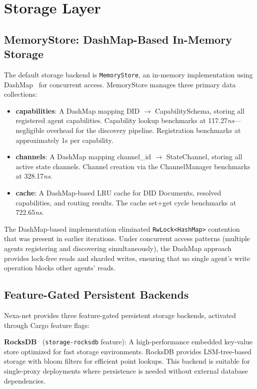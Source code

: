 \section{Storage Layer}

\subsection{MemoryStore: DashMap-Based In-Memory Storage}

The default storage backend is \texttt{MemoryStore}, an in-memory implementation using DashMap~\cite{dashmap2022} for concurrent access. MemoryStore manages three primary data collections:

\begin{itemize}
  \item \textbf{capabilities}: A DashMap mapping DID $\rightarrow$ CapabilitySchema, storing all registered agent capabilities. Capability lookup benchmarks at 117.27\textit{ns}---negligible overhead for the discovery pipeline. Registration benchmarks at approximately 1\textmu s per capability.
  \item \textbf{channels}: A DashMap mapping channel\_id $\rightarrow$ StateChannel, storing all active state channels. Channel creation via the ChannelManager benchmarks at 328.17\textit{ns}.
  \item \textbf{cache}: A DashMap-based LRU cache for DID Documents, resolved capabilities, and routing results. The cache set+get cycle benchmarks at 722.65\textit{ns}.
\end{itemize}

The DashMap-based implementation eliminated \texttt{RwLock<HashMap>} contention that was present in earlier iterations. Under concurrent access patterns (multiple agents registering and discovering simultaneously), the DashMap approach provides lock-free reads and sharded writes, ensuring that no single agent's write operation blocks other agents' reads.

\subsection{Feature-Gated Persistent Backends}

Nexa-net provides three feature-gated persistent storage backends, activated through Cargo feature flags:

\textbf{RocksDB}~\cite{rocksdb2014} (\texttt{storage-rocksdb} feature): A high-performance embedded key-value store optimized for fast storage environments. RocksDB provides LSM-tree-based storage with bloom filters for efficient point lookups. This backend is suitable for single-proxy deployments where persistence is needed without external database dependencies.

